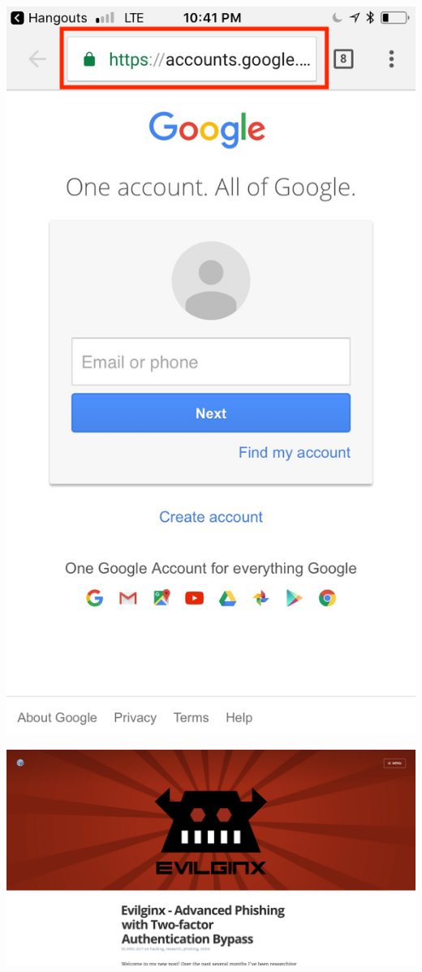 \documentclass[nobackground,dvipsnames,table,aspectratio=169]{beamer}
\begin{document}
\begin{frame}{}%
    \thispagestyle{empty}
    \includegraphics[height=\paperheight]{bad-link-mobile}
\end{frame}

\begin{frame}{}%
    \thispagestyle{empty}
    \includegraphics[width=\paperwidth]{evilginx}
\end{frame}
\end{document}
